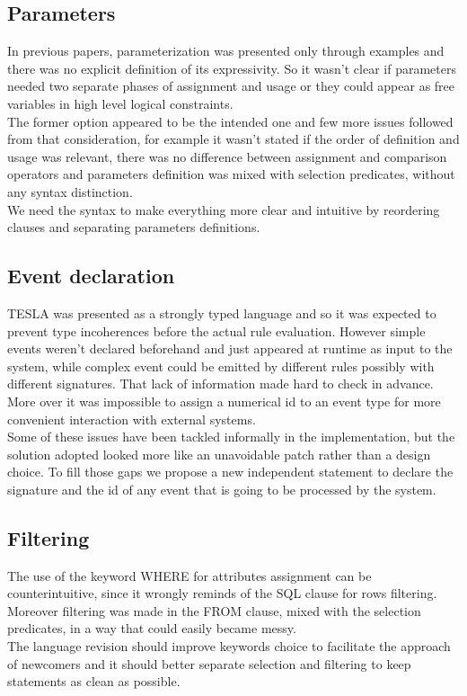 \subsection{Parameters}
In previous papers, parameterization was presented only through examples and there was no explicit definition of its expressivity. So it wasn't clear if parameters needed two separate phases of assignment and usage or they could appear as free variables in high level logical constraints.\\
The former option appeared to be the intended one and few more issues followed from that consideration, for example it wasn't stated if the order of definition and usage was relevant, there was no difference between assignment and comparison operators and parameters definition was mixed with selection predicates, without any syntax distinction.\\
We need the syntax to make everything more clear and intuitive by reordering clauses and separating parameters definitions.

\subsection{Event declaration}
TESLA was presented as a strongly typed language and so it was expected to prevent type incoherences before the actual rule evaluation. However simple events weren't declared beforehand and just appeared at runtime as input to the system, while complex event could be emitted by different rules possibly with different signatures. That lack of information made hard to check in advance.\\
More over it was impossible to assign a numerical id to an event type for more convenient interaction with external systems.\\
Some of these issues have been tackled informally in the implementation, but the solution adopted looked more like an unavoidable patch rather than a design choice. To fill those gaps we propose a new independent statement to declare the signature and the id of any event that is going to be processed by the system.

\subsection{Filtering}
The use of the keyword WHERE for attributes assignment can be counterintuitive, since it wrongly reminds of the SQL  clause for rows filtering.\\
Moreover filtering was made in the FROM clause, mixed with the selection predicates, in a way that could easily became messy.\\
The language revision should improve keywords choice to facilitate the approach of newcomers and it should better separate selection and filtering to keep statements as clean as possible.

